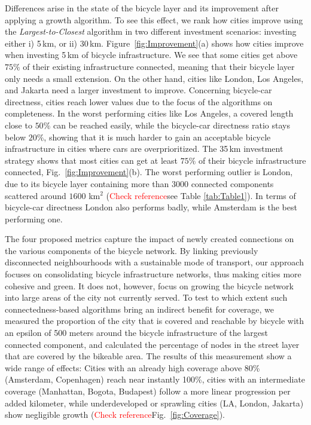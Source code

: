 Differences arise in the state of the bicycle layer and its improvement after applying a growth algorithm. To see this effect, we rank how cities improve using the \textit{Largest-to-Closest} algorithm in two different investment scenarios: investing either i) 5\,km, or ii) 30\,km. Figure~\ref{fig:Improvement}(a) shows how cities improve when investing 5\,km of bicycle infrastructure. We see that some cities get above $75\%$ of their existing infrastructure connected, meaning that their bicycle layer only needs a small extension. On the other hand, cities like London, Los Angeles, and Jakarta need a larger investment to improve. Concerning bicycle-car directness, cities reach lower values due to the focus of the algorithms on completeness. In the worst performing cities like Los Angeles, a covered length close to $50\%$ can be reached easily, while the bicycle-car directness ratio stays below $20\%$, showing that it is much harder to gain an acceptable bicycle infrastructure in cities where cars are overprioritized. The 35\,km investment strategy shows that most cities can get at least $75\%$ of their bicycle infrastructure connected, Fig.~\ref{fig:Improvement}(b). The worst performing outlier is London, due to its bicycle layer containing more than 3000 connected components scattered around $1600$ km$^2$ (\textcolor{red}{Check reference}see Table \ref{tab:Table1}). In terms of bicycle-car directness London also performs badly, while Amsterdam is the best performing one.

The four proposed metrics capture the impact of newly created connections on the various components of the bicycle network. By linking previously disconnected neighbourhoods with a sustainable mode of transport, our approach focuses on consolidating bicycle infrastructure networks, thus making cities more cohesive and green. It does not, however, focus on growing the bicycle network into large areas of the city not currently served. To test to which extent such connectedness-based algorithms bring an indirect benefit for coverage, we measured the proportion of the city that is covered and reachable by bicycle with an epsilon of 500 meters around the bicycle infrastructure of the largest connected component, and calculated the percentage of nodes in the street layer that are covered by the bikeable area. The results of this measurement show a wide range of effects: Cities with an already high coverage above 80\% (Amsterdam, Copenhagen) reach near instantly 100\%, cities with an intermediate coverage (Manhattan, Bogota, Budapest) follow a more linear progression per added kilometer, while underdeveloped or sprawling cities (LA, London, Jakarta) show negligible growth (\textcolor{red}{Check reference}Fig.~\ref{fig:Coverage}).

